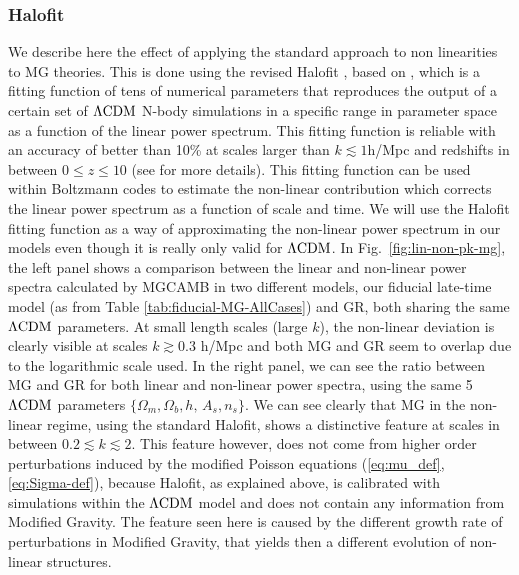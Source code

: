 \subsubsection{Halofit}
We describe here the effect of applying the standard 
approach to non linearities to MG theories. This is done using
the revised Halofit \cite{takahashi_revising_2012}, based on
\cite{smith_stable_2003},
which is a fitting function of tens of numerical parameters that reproduces
the output of a certain set of $\Lambda\mathrm{CDM}$ N-body simulations in a specific
range in parameter space as a function of the linear power spectrum.
This fitting function is reliable with an accuracy of better than
10\% at scales larger than $k\lesssim1$h/Mpc and redshifts in between
$0\leq z\leq10$ (see \cite{takahashi_revising_2012} for more details).
This fitting function can be used within Boltzmann codes to estimate
the non-linear contribution which corrects the linear power spectrum
as a function of scale and time. We will use the Halofit fitting function
 as a way of approximating the non-linear power spectrum in
our models even though it is really only valid for $\Lambda\mathrm{CDM}$. 
In Fig.\ \ref{fig:lin-non-pk-mg}, the left panel
shows a comparison between the linear and non-linear power spectra
calculated by MGCAMB in two different models, our fiducial late-time
model (as from Table \ref{tab:fiducial-MG-AllCases}) and GR, both sharing
the same $\Lambda\mathrm{CDM}$ parameters. At small length scales (large $k$),
the non-linear deviation is clearly visible at scales $k\gtrsim0.3$ h/Mpc
and both MG and GR seem to overlap due to the logarithmic scale used.
In the right panel, we can see the ratio between MG and GR for both linear
and non-linear power spectra, using the same 5 $\Lambda\mathrm{CDM}$ parameters
$\{\Omega_{m},\Omega_{b},h,\,A_{s},n_{s}\}$. We can see clearly that
MG in the non-linear regime, using the standard Halofit, shows a distinctive
feature at scales in between $0.2\lesssim k\lesssim2$. This feature
however, does not come from higher order perturbations induced by
the modified Poisson equations (\ref{eq:mu_def}, \ref{eq:Sigma-def}),
because Halofit, as explained above, is calibrated with simulations
within the $\Lambda\mathrm{CDM}$ model and does not contain any information from
Modified Gravity. The feature seen here is caused by the different
growth rate of perturbations in Modified Gravity, that yields then
a different evolution of non-linear structures. 

